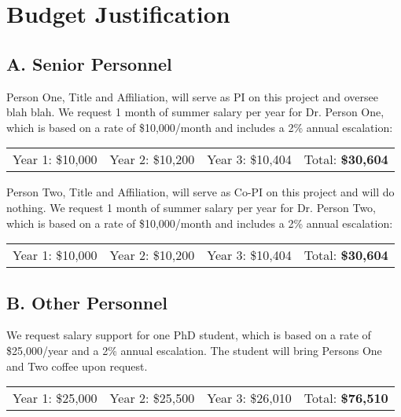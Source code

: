 
\section*{Budget Justification}

\subsection*{A. Senior Personnel}

 Person One, Title and Affiliation, will serve as PI on this project and oversee blah blah. We request 1 month of summer salary per year for Dr. Person One, which is based on a rate of \$10,000/month and includes a 2\% annual escalation:
\newline
\begin{table}[h]
\begin{tabular}[c]{cccc}
Year 1: \$10,000 & Year 2: \$10,200 & Year 3: \$10,404 & Total: \textbf{\$30,604}
\end{tabular}
\end{table}
\newline
\newline
{} Person Two, Title and Affiliation, will serve as Co-PI on this project and will do nothing. We request 1 month of summer salary per year for Dr. Person Two, which is based on a rate of \$10,000/month and includes a 2\% annual escalation:
\newline
\begin{table}[h]
\begin{tabular}[c]{cccc}
Year 1: \$10,000 & Year 2: \$10,200 & Year 3: \$10,404 & Total: \textbf{\$30,604}
\end{tabular}
\end{table}

\subsection*{B. Other Personnel}
 We request salary support for one PhD student, which is based on a rate of \$25,000/year and a 2\% annual escalation. The student will bring Persons One and Two coffee upon request.
\newline
\begin{table}[h]
\begin{tabular}[c]{cccc}
Year 1: \$25,000 & Year 2: \$25,500 & Year 3: \$26,010 & Total: \textbf{\$76,510}
\end{tabular}
\end{table}

